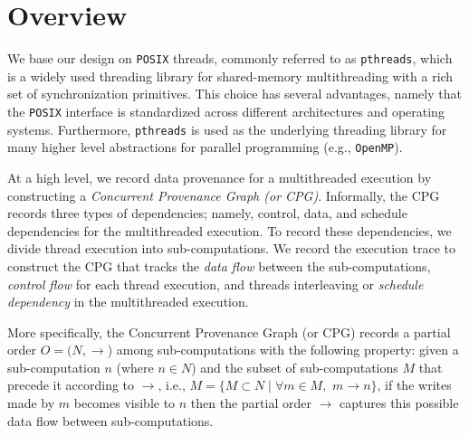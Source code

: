 \section{Overview}
\label{sec:overview}
%

We base our design on {\tt POSIX} threads, commonly referred to as
{\tt pthreads}, which is a widely used threading library for shared-memory
multithreading with a rich set of synchronization primitives.  This
choice has several advantages, namely that the {\tt POSIX} interface
is standardized across different architectures and operating systems. Furthermore, {\tt pthreads} is used as the underlying threading
library for many higher level abstractions for parallel programming
(e.g., {\tt OpenMP}).




 At a high level, we record data provenance for a multithreaded execution by constructing a {\em Concurrent Provenance Graph (or CPG)}. Informally,  the CPG records three types of dependencies; namely, control, data, and schedule dependencies for the multithreaded execution. To record these dependencies, we divide thread execution into sub-computations. We record the execution trace to construct the CPG that tracks the {\em data flow} between the sub-computations, {\em control flow} for each thread execution, and threads interleaving or {\em schedule dependency}  in the multithreaded execution.

More specifically, the Concurrent Provenance Graph (or CPG) records a partial order $O = (N, \rightarrow$) among sub-computations with the following property: given a sub-computation $n$ (where $n \in N $)  and the subset of sub-computations $M$ that precede it according to $\rightarrow$, i.e., $M = \{M \subset N \mid \forall m \in M,$ $m \rightarrow n\}$, if the writes made by $m$ becomes visible to $n$ then the partial order $\rightarrow$ captures this possible data flow between sub-computations.




